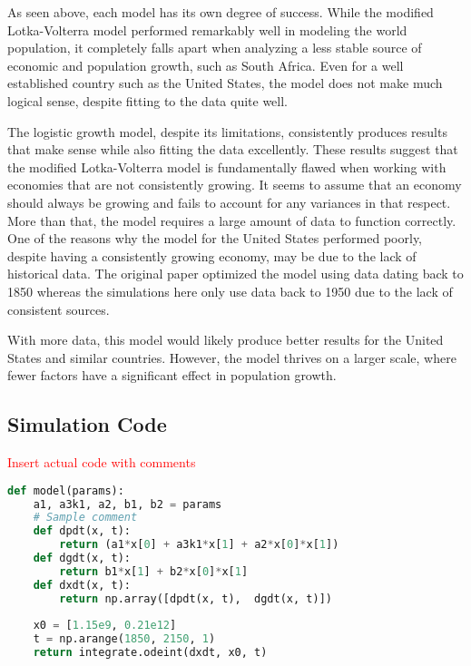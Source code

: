 \documentclass[a4paper]{article}
\newcommand{\todo}[1]{{\Large\textcolor{red}{#1}}}
\begin{document}
As seen above, each model has its own degree of success. While the modified Lotka-Volterra model performed remarkably well in modeling the world population, it completely falls apart when analyzing a less stable source of economic and population growth, such as South Africa. Even for a well established country such as the United States, the model does not make much logical sense, despite fitting to the data quite well. 

The logistic growth model, despite its limitations, consistently produces results that make sense while also fitting the data excellently. These results suggest that the modified Lotka-Volterra model is fundamentally flawed when working with economies that are not consistently growing. It seems to assume that an economy should always be growing and fails to account for any variances in that respect. More than that, the model requires a large amount of data to function correctly. One of the reasons why the model for the United States performed poorly, despite having a consistently growing economy, may be due to the lack of historical data. The original paper optimized the model using data dating back to 1850 whereas the simulations here only use data back to 1950 due to the lack of consistent sources. 

With more data, this model would likely produce better results for the United States and similar countries. However, the model thrives on a larger scale, where fewer factors have a significant effect in population growth.

\newpage

\begin{appendices}
\section{Simulation Code}
\todo{Insert actual code with comments}

\begin{lstlisting}[language=Python]
def model(params):   
    a1, a3k1, a2, b1, b2 = params
    # Sample comment
    def dpdt(x, t):
        return (a1*x[0] + a3k1*x[1] + a2*x[0]*x[1])
    def dgdt(x, t):
        return b1*x[1] + b2*x[0]*x[1]
    def dxdt(x, t):
        return np.array([dpdt(x, t),  dgdt(x, t)])
    
    x0 = [1.15e9, 0.21e12]
    t = np.arange(1850, 2150, 1)
    return integrate.odeint(dxdt, x0, t)
\end{lstlisting}

\end{appendices}

\newpage

\nocite{*}


\end{document}
